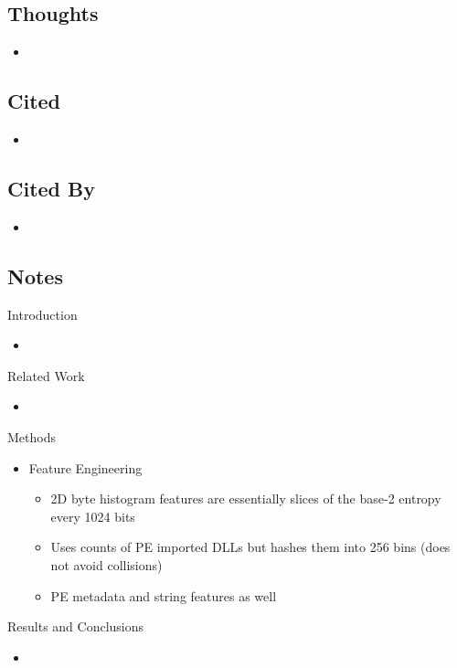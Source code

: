 \documentclass{article}
\begin{document}
\subsection*{Thoughts}
\begin{itemize}
\item
\end{itemize}

\subsection*{Cited}
\begin{itemize}
\item
\end{itemize}

\subsection*{Cited By}
\begin{itemize}
\item
\end{itemize}

\subsection*{Notes}

Introduction
\begin{itemize}
\item 
\end{itemize}
Related Work
\begin{itemize}
\item 
\end{itemize}
Methods
\begin{itemize}
\item Feature Engineering
	\begin{itemize}
	\item 2D byte histogram features are essentially slices of the base-2 entropy every 1024 bits
	\item Uses counts of PE imported DLLs but hashes them into 256 bins (does not avoid collisions)
	\item PE metadata and string features as well
	\end{itemize}
\end{itemize}
Results and Conclusions
\begin{itemize}
\item
\end{itemize}
\pagebreak

\end{document}
